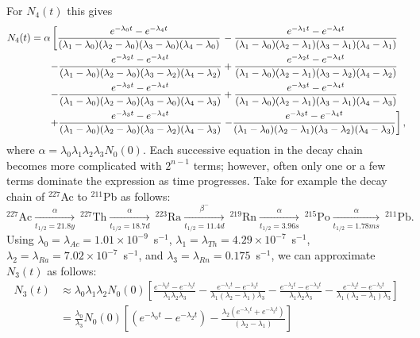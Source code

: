 \documentclass[11pt]{article}
\begin{document}
For $N_4(t)$ this gives
\begin{align}
\label{eq:N4}
N_4(t)=\alpha\left[\frac{e^{-\lambda_0t}-e^{-\lambda_4t}}{(\lambda_1-\lambda_0)(\lambda_2-\lambda_0)(\lambda_3-\lambda_0)(\lambda_4-\lambda_0)}\right.&-\frac{e^{-\lambda_1t}-e^{-\lambda_4t}}{(\lambda_1-\lambda_0)(\lambda_2-\lambda_1)(\lambda_3-\lambda_1)(\lambda_4-\lambda_1)}\notag\\-\frac{e^{-\lambda_2t}-e^{-\lambda_4t}}{(\lambda_1-\lambda_0)(\lambda_2-\lambda_0)(\lambda_3-\lambda_2)(\lambda_4-\lambda_2)}&+\frac{e^{-\lambda_2t}-e^{-\lambda_4t}}{(\lambda_1-\lambda_0)(\lambda_2-\lambda_1)(\lambda_3-\lambda_2)(\lambda_4-\lambda_2)}\notag\\-\frac{e^{-\lambda_3t}-e^{-\lambda_4t}}{(\lambda_1-\lambda_0)(\lambda_2-\lambda_0)(\lambda_3-\lambda_0)(\lambda_4-\lambda_3)}&+\frac{e^{-\lambda_3t}-e^{-\lambda_4t}}{(\lambda_1-\lambda_0)(\lambda_2-\lambda_1)(\lambda_3-\lambda_1)(\lambda_4-\lambda_3)}\notag\\+\frac{e^{-\lambda_3t}-e^{-\lambda_4t}}{(\lambda_1-\lambda_0)(\lambda_2-\lambda_0)(\lambda_3-\lambda_2)(\lambda_4-\lambda_3)}&\left.-\frac{e^{-\lambda_3t}-e^{-\lambda_4t}}{(\lambda_1-\lambda_0)(\lambda_2-\lambda_1)(\lambda_3-\lambda_2)(\lambda_4-\lambda_3)}\right],
\end{align}
where $\alpha=\lambda_0\lambda_1\lambda_2\lambda_3N_0(0)$.
Each successive equation in the decay chain becomes more complicated with $2^{n-1}$ terms; however, often only one or a few terms dominate the expression as time progresses. Take for example the decay chain of $^{227}$Ac to $^{211}$Pb as follows:
\begin{equation}
\label{eq:decay_chain_diagram}
^{227}\text{Ac}\xrightarrow[t_{1/2}=21.8 y]{\alpha}~^{227}\text{Th}\xrightarrow[t_{1/2}=18.7 d]{\alpha}~^{223}\text{Ra}\xrightarrow[t_{1/2}=11.4 d]{\beta^-}~^{219}\text{Rn}\xrightarrow[t_{1/2}=3.96 s]{\alpha}~^{215}\text{Po}\xrightarrow[t_{1/2}=1.78ms]{\alpha}~^{211}\text{Pb}.
\end{equation}
Using $\lambda_0=\lambda_{Ac}=1.01\times10^{-9}$~s$^{-1}$, $\lambda_1=\lambda_{Th}=4.29\times10^{-7}$~s$^{-1}$, $\lambda_2=\lambda_{Ra}=7.02\times10^{-7}$~s$^{-1}$, and $\lambda_3=\lambda_{Rn}=0.175$~s$^{-1}$, we can approximate $N_3(t)$ as follows:
\begin{align}
N_3(t)&\approx\lambda_0\lambda_1\lambda_2N_0(0)\left[\frac{e^{-\lambda_0t}-e^{-\lambda_3t}}{\lambda_1\lambda_2\lambda_3}-\frac{e^{-\lambda_1t}-e^{-\lambda_3t}}{\lambda_1(\lambda_2-\lambda_1)\lambda_3}-\frac{e^{-\lambda_2t}-e^{-\lambda_3t}}{\lambda_1\lambda_2\lambda_3}-\frac{e^{-\lambda_2t}-e^{-\lambda_3t}}{\lambda_1(\lambda_2-\lambda_1)\lambda_3}\right]\\&=\frac{\lambda_0}{\lambda_3}N_0(0)\left[\left(e^{-\lambda_0t}-e^{-\lambda_2t}\right)-\frac{\lambda_2\left(e^{-\lambda_1t}+e^{-\lambda_2t}\right)}{(\lambda_2-\lambda_1)}\right]
\end{align}
\end{document}
